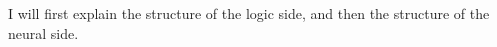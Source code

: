 \documentclass[orivec]{llncs}
\newcommand{\emp}[1]{\textbf{\textcolor{Cerulean}{#1}}}
\begin{document}
I will first explain the structure of the logic side, and then the structure of the neural side.

\end{document}
